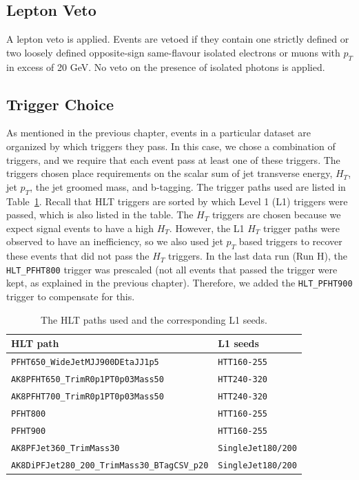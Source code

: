 \subsection{Lepton Veto}

A lepton veto is applied. Events are vetoed if they contain one strictly defined or two loosely defined opposite-sign same-flavour isolated electrons or muons with $p_{T}$ in excess of 20 GeV. No veto on the presence of isolated photons is applied. 

\subsection{Trigger Choice \label{ss:trigger}}

As mentioned in the previous chapter, events in a particular dataset are organized by which triggers they pass. In this case, we chose a combination of triggers, and we require that each event pass at least one of these triggers. The triggers chosen place requirements on the scalar sum of jet transverse energy, $H_{T}$, jet $p_{T}$, the jet groomed mass, and b-tagging. The trigger paths used are listed in Table~\ref{tab:trigpaths}. Recall that HLT triggers are sorted by which Level 1 (L1) triggers were passed, which is also listed in the table. The $H_{T}$ triggers are chosen because we expect signal events to have a high $H_{T}$. However, the L1 $H_{T}$ trigger paths were observed to have an inefficiency, so we also used jet $p_{T}$ based triggers to recover these events that did not pass the $H_{T}$ triggers. In the last data run (Run H), the \texttt{HLT\_PFHT800} trigger was prescaled (not all events that passed the trigger were kept, as explained in the previous chapter). Therefore, we added the \texttt{HLT\_PFHT900} trigger to compensate for this.
\begin{table} [htb]
  \begin{center}
    \caption{The HLT paths used and the corresponding L1 seeds.}\label{tab:trigpaths}
    \begin{tabular}{|l|l|}
      \hline
      HLT path & L1 seeds \\
      \hline
       \texttt{PFHT650\_WideJetMJJ900DEtaJJ1p5}              & \texttt{HTT160-255} \\  
       \texttt{AK8PFHT650\_TrimR0p1PT0p03Mass50}             & \texttt{HTT240-320} \\  
       \texttt{AK8PFHT700\_TrimR0p1PT0p03Mass50}             & \texttt{HTT240-320} \\
       \texttt{PFHT800}                                      & \texttt{HTT160-255} \\  
       \texttt{PFHT900}                                      & \texttt{HTT160-255} \\  
       \texttt{AK8PFJet360\_TrimMass30}                      & \texttt{SingleJet180/200} \\  
       \texttt{AK8DiPFJet280\_200\_TrimMass30\_BTagCSV\_p20} & \texttt{SingleJet180/200} \\   
      \hline
    \end{tabular}
  \end{center}
\end{table}
